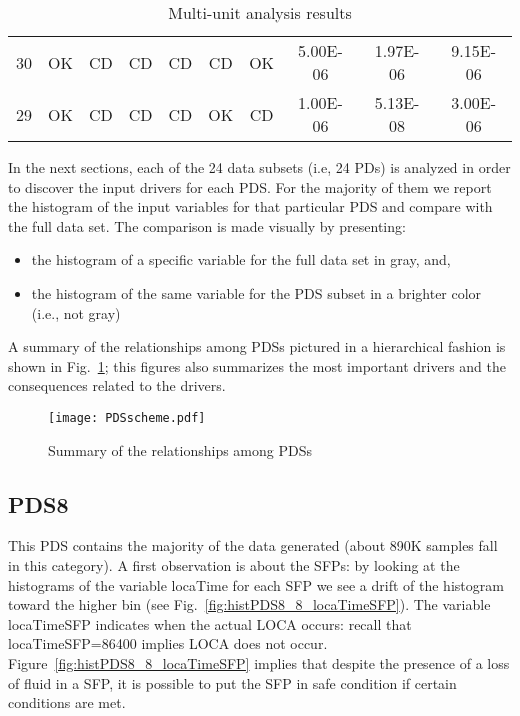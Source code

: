 \begin{table}
\begin{tabular}{c|cccccc|ccc}
     30   & OK   & \cellcolor[gray]{0.95}CD   & \cellcolor[gray]{0.95}CD   & \cellcolor[gray]{0.95}CD   & \cellcolor[gray]{0.95}CD   & OK   & 5.00E-06    & 1.97E-06    & 9.15E-06    \\         
     29   & OK   & \cellcolor[gray]{0.95}CD   & \cellcolor[gray]{0.95}CD   & \cellcolor[gray]{0.95}CD   & OK   & \cellcolor[gray]{0.95}CD   & 1.00E-06    & 5.13E-08    & 3.00E-06    \\    
    \hline
  \end{tabular}
  \caption{Multi-unit analysis results}
  \label{tab:resultsMain}
\end{table}

In the next sections, each of the 24 data subsets (i.e, 24 PDs) is analyzed in order to 
discover the input drivers for each PDS. For the majority of them we report the histogram 
of the input variables for that particular 
PDS and compare with the full data set. The comparison is made visually by presenting:
\begin{itemize}
  \item the histogram of a specific variable for the full data set in gray, and, 
  \item the histogram of the same variable for the PDS subset in a brighter color (i.e., not gray)
\end{itemize}

A summary of the relationships among PDSs pictured in a hierarchical fashion is shown in 
Fig.~\ref{fig:RISMCoverview}; this figures also summarizes the most important drivers and the
consequences related to the drivers.

\begin{figure}
    \centering
    \centerline{\texttt{[image: PDSscheme.pdf]}}
    \caption{Summary of the relationships among PDSs}
    \label{fig:RISMCoverview}
\end{figure}

\subsection{PDS8}
This PDS contains the majority of the data generated (about 890K samples fall in this category).
A first observation is about the SFPs: by looking at the histograms of the variable locaTime for each SFP
we see a drift of the histogram toward the higher bin (see Fig.~\ref{fig:histPDS8_8_locaTimeSFP}). 
The variable locaTimeSFP indicates when the actual LOCA
occurs: recall that locaTimeSFP=86400 implies LOCA does not occur.
Figure~\ref{fig:histPDS8_8_locaTimeSFP} implies that despite the presence of a 
loss of fluid in a SFP, it is possible to put the SFP in safe condition if certain conditions are met.

